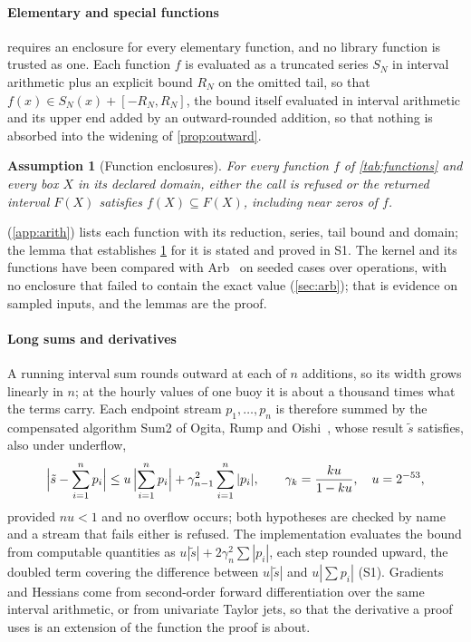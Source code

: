 \documentclass[preprint,11pt,a4paper]{elsarticle}
\newtheorem{assumption}{Assumption}
\theoremstyle{definition}
\newcommand{\supp}[1]{S#1}
\begin{document}
\paragraph{Elementary and special functions}
 requires an enclosure for every elementary function, and no library function is trusted as one. Each function $f$ is evaluated as a truncated series $S_N$ in interval arithmetic plus an explicit bound $R_N$ on the omitted tail, so that $f(x)\in S_N(x)+[-R_N,R_N]$, the bound itself evaluated in interval arithmetic and its upper end added by an outward-rounded addition, so that nothing is absorbed into the widening of \cref{prop:outward}.

\begin{assumption}[Function enclosures]\label{ass:functions}
For every function $f$ of \cref{tab:functions} and every box $X$ in its declared domain, either the call is refused or the returned interval $F(X)$ satisfies $f(X)\subseteq F(X)$, including near zeros of $f$.
\end{assumption}

 (\ref{app:arith}) lists each function with its reduction, series, tail bound and domain; the lemma that establishes \cref{ass:functions} for it is stated and proved in \supp{1}. The kernel and its functions have been compared with Arb~\citep{Johansson17} on \MtArbCases{} seeded cases over \MtArbOps{} operations, with no enclosure that failed to contain the exact value (\cref{sec:arb}); that is evidence on sampled inputs, and the lemmas are the proof.

\paragraph{Long sums and derivatives}
A running interval sum rounds outward at each of $n$ additions, so its width grows linearly in $n$; at the \RBuoyN{} hourly values of one buoy it is about a thousand times what the terms carry. Each endpoint stream $p_1,\dots,p_n$ is therefore summed by the compensated algorithm Sum2 of Ogita, Rump and Oishi~\citep[Proposition~4.5]{Ogita05}, whose result $\tilde s$ satisfies, also under underflow,
\begin{equation}\label{eq:sum2}
\Bigl|\tilde s-\sum_{i=1}^n p_i\Bigr|\le u\,\Bigl|\sum_{i=1}^n p_i\Bigr| +\gamma_{n-1}^2\sum_{i=1}^n|p_i|,\qquad \gamma_k=\frac{ku}{1-ku},\quad u=2^{-53},
\end{equation}
provided $nu<1$ and no overflow occurs; both hypotheses are checked by name and a stream that fails either is refused. The implementation evaluates the bound from computable quantities as $u|\tilde s|+2\gamma_n^2\sum|p_i|$, each step rounded upward, the doubled term covering the difference between $u|\tilde s|$ and $u|\sum p_i|$ (\supp{1}). Gradients and Hessians come from second-order forward differentiation over the same interval arithmetic, or from univariate Taylor jets, so that the derivative a proof uses is an extension of the function the proof is about.
\end{document}
